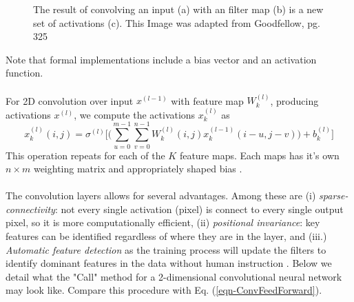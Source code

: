 \documentclass[12pt,letterpaper]{article}
\begin{document}
\begin{figure}[H]
\begin{center}
\end{center}
\caption{The result of convolving an input (a) with an filter map (b) is a new set of activations (c). This Image was adapted from Goodfellow, pg. 325 \cite{Goodfellow}}
\label{fig-2DConvExample}
\end{figure}
Note that formal implementations include a bias vector and an activation function.

\paragraph*{}For 2D convolution over input $x^{(l-1)}$ with feature map $W^{(l)}_k$, producing activations $x^{(l)}$, we compute the activations $x^{(l)}_{k}$ as \cite{Goodfellow}
\begin{equation}
\label{eqn-ConvFeedForward}
x^{(l)}_k(i,j) = \sigma^{(l)}\bigg[ \Big( \sum_{u=0}^{m-1} \sum_{v=0}^{n-1} W^{(l)}_k(i,j) x^{(l-1)}_k(i - u,j - v) \Big) + b^{(l)}_k \bigg]
\end{equation}
This operation repeats for each of the $K$ feature maps. Each maps has it's own $n \times m$ weighting matrix and appropriately shaped bias .

\paragraph*{}The convolution layers allows for several advantages. Among these are (i) \textit{sparse-connectivity}: not every single activation (pixel) is connect to every single output pixel, so it is more computationally efficient, (ii) \textit{positional invariance}: key features can be identified regardless of where they are in the layer, and (iii.) \textit{Automatic feature detection} as the training process will update the filters to identify dominant features in the data without human instruction \cite{Geron,Goodfellow,Loy}. Below we detail what the "Call" method for a 2-dimensional convolutional neural network may look like. Compare this procedure with Eq. (\ref{eqn-ConvFeedForward}).
\end{document}

